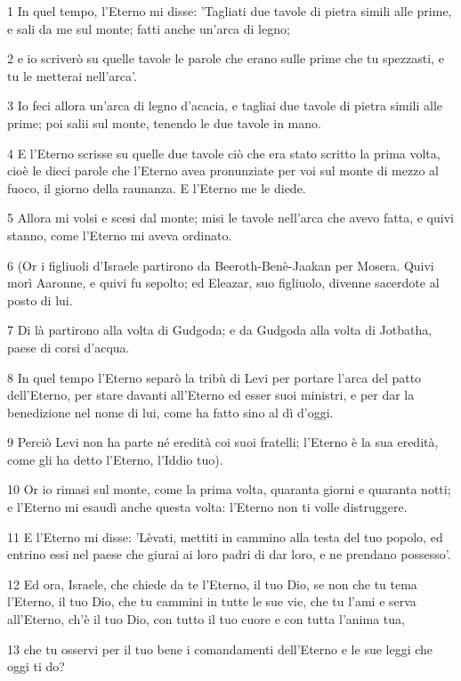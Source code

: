 \par 1 In quel tempo, l'Eterno mi disse: 'Tagliati due tavole di pietra simili alle prime, e sali da me sul monte; fatti anche un'arca di legno;
\par 2 e io scriverò su quelle tavole le parole che erano sulle prime che tu spezzasti, e tu le metterai nell'arca'.
\par 3 Io feci allora un'arca di legno d'acacia, e tagliai due tavole di pietra simili alle prime; poi salii sul monte, tenendo le due tavole in mano.
\par 4 E l'Eterno scrisse su quelle due tavole ciò che era stato scritto la prima volta, cioè le dieci parole che l'Eterno avea pronunziate per voi sul monte di mezzo al fuoco, il giorno della raunanza. E l'Eterno me le diede.
\par 5 Allora mi volsi e scesi dal monte; misi le tavole nell'arca che avevo fatta, e quivi stanno, come l'Eterno mi aveva ordinato.
\par 6 (Or i figliuoli d'Israele partirono da Beeroth-Benè-Jaakan per Mosera. Quivi morì Aaronne, e quivi fu sepolto; ed Eleazar, suo figliuolo, divenne sacerdote al posto di lui.
\par 7 Di là partirono alla volta di Gudgoda; e da Gudgoda alla volta di Jotbatha, paese di corsi d'acqua.
\par 8 In quel tempo l'Eterno separò la tribù di Levi per portare l'arca del patto dell'Eterno, per stare davanti all'Eterno ed esser suoi ministri, e per dar la benedizione nel nome di lui, come ha fatto sino al dì d'oggi.
\par 9 Perciò Levi non ha parte né eredità coi suoi fratelli; l'Eterno è la sua eredità, come gli ha detto l'Eterno, l'Iddio tuo).
\par 10 Or io rimasi sul monte, come la prima volta, quaranta giorni e quaranta notti; e l'Eterno mi esaudì anche questa volta: l'Eterno non ti volle distruggere.
\par 11 E l'Eterno mi disse: 'Lèvati, mettiti in cammino alla testa del tuo popolo, ed entrino essi nel paese che giurai ai loro padri di dar loro, e ne prendano possesso'.
\par 12 Ed ora, Israele, che chiede da te l'Eterno, il tuo Dio, se non che tu tema l'Eterno, il tuo Dio, che tu cammini in tutte le sue vie, che tu l'ami e serva all'Eterno, ch'è il tuo Dio, con tutto il tuo cuore e con tutta l'anima tua,
\par 13 che tu osservi per il tuo bene i comandamenti dell'Eterno e le sue leggi che oggi ti do?
